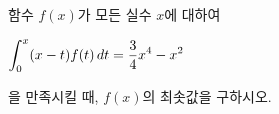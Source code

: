 함수 $f(x)$가 모든 실수 $x$에 대하여 \par\smallskip\noindent\hspace*{1.5em}$\displaystyle\int_{0}^{x}(x-t)f(t)\mkern3mu dt=\dfrac{3}{4}x^4-x^2$\par\smallskip\noindent 을 만족시킬 때, $f(x)$의 최솟값을 구하시오.
